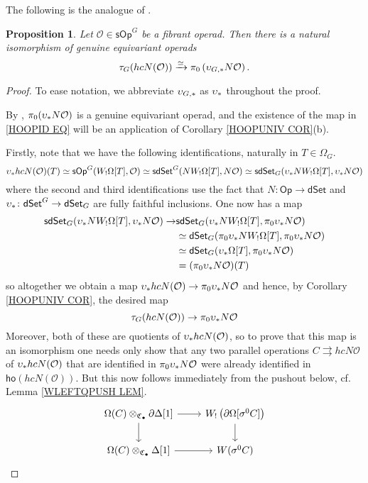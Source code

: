 \documentclass[a4paper,10pt]{article}%
\numberwithin{equation}{section}
\numberwithin{figure}{section}
\newtheorem{proposition}[equation]{Proposition}%
\theoremstyle{definition} %
\newcommand{\dSet}{\mathsf{dSet}}
\renewcommand{\O}{\ensuremath{\mathcal O}}
\newcommand{\1}{\ensuremath{\mathbbm 1}}%
\begin{document}
The following is the analogue of \cite[Prop. 4.8]{CM13b}.

\begin{proposition}\label{HOOPID_PROP}
Let $\mathcal{O} \in \mathsf{sOp}^G$
be a fibrant operad. 
Then there is a natural isomorphism of genuine equivariant operads
\begin{equation}\label{HOOPID EQ}
\tau_G(hcN(\mathcal{O})) \xrightarrow{\simeq}
\pi_0 \left( \upsilon_{G,\**} N\mathcal{O} \right).
\end{equation}
\end{proposition}


\begin{proof}
	To ease notation, we abbreviate
	$\upsilon_{G,\**}$ as $\upsilon_{\**}$
	throughout the proof.

      By \cite[Prop. 5.9]{BP_edss}, $\pi_0(\upsilon_{\**}N\O)$ is a genuine equivariant operad,
      and the existence of the map in \eqref{HOOPID EQ}
      will be an application of
      Corollary \ref{HOOPUNIV COR}(b).

Firstly,
note that we have the following identifications,
naturally in $T \in \Omega_G$.
\[
\upsilon_{\**}hcN(\O)(T)
\simeq
\mathsf{sOp}^G(W_!\Omega[T],\O)
\simeq
\mathsf{sdSet}^G(N W_!\Omega[T],N \O)
\simeq 
\mathsf{sdSet}_G(\upsilon_{\**}N W_!\Omega[T],\upsilon_{\**}N \O)
\]
where the second and third identifications use the fact that 
$N\colon \mathsf{Op} \to \mathsf{dSet}$ and $\upsilon_{\**} \colon \dSet^G \to \dSet_G$
are fully faithful inclusions. 
One now has a map
\begin{align*}
  \mathsf{sdSet}_G(\upsilon_{\**}N W_!\Omega[T],\upsilon_{\**}N \O)
  \to &
    \mathsf{sdSet}_G(\upsilon_{\**}N W_!\Omega[T],\pi_0\upsilon_{\**}N \O)
  \\ & \simeq
       \mathsf{dSet}_G(\pi_0 \upsilon_{\**}  N W_!\Omega[T],\pi_0\upsilon_{\**}N \O)
  \\ & \simeq
       \mathsf{dSet}_G(\upsilon_{\**}\Omega[T],\pi_0\upsilon_{\**}N \O)
  \\ & =
       (\pi_0\upsilon_{\**}N \O)(T)
\end{align*}
so altogether we obtain a map
$\upsilon_{\**}hcN(\O) \to \pi_0 \upsilon_{\**} N \O$
and hence, by Corollary \ref{HOOPUNIV COR},
the desired map 
\[
	\tau_G(hcN(\O)) \to \pi_0 \upsilon_{\**} N \O
\]
Moreover, both of these are quotients of $\upsilon_{\**}hcN(\O)$,
so to prove that this map is an isomorphism one needs only show that any two parallel operations $C \rightrightarrows hcN \O$ of $\upsilon_{\**}hcN(\O)$
that are identified in 
$\pi_0 \upsilon_{\**} N \O$
were already identified in 
$\mathsf{ho}(hcN(\O))$.
But this now follows immediately from the pushout below,
cf. Lemma \ref{WLEFTQPUSH LEM}.
\[
\begin{tikzcd}
	\Omega(C) \otimes_{\mathfrak{C}_{\bullet}}
	\partial \Delta[1]
	\ar{r} \ar{d}
&
	W_! \left(\partial \Omega[\sigma^0 C]\right) 
	\ar{d}
\\
	\Omega(C) \otimes_{\mathfrak{C}_{\bullet}}
	\Delta[1]
	\ar{r}
&
	W(\sigma^0 C)
\end{tikzcd}
\]
\end{proof}
\end{document}
